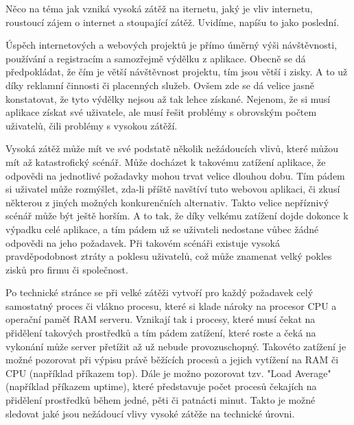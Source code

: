 \documentclass[12pt]{article}
\begin{document}
\pagestyle{headings}



\obsah
{}



Něco na téma jak vzniká vysoká zátěž na iternetu, jaký je vliv internetu, roustoucí zájem o internet a stoupající zátěž. Uvidíme, napíšu to jako poslední.


Úspěch internetových a webových projektů je přímo úměrný výši návštěvnosti, používání a registracím a samozřejmě výdělku z aplikace. Obecně se dá předpokládat, že čím je větší návštěvnost projektu, tím jsou větší i zisky. A to už díky reklamní činnosti či placenných služeb. Ovšem zde se dá velice jasně konstatovat, že tyto výdělky nejsou až tak lehce získané. Nejenom, že si musí aplikace získat své uživatele, ale musí řešit problémy s obrovským počtem uživatelů, čili problémy s vysokou zátěží.

Vysoká zátěž může mít ve své podstatě několik nežádoucích vlivů, které můžou mít až katastrofický scénář. Může docházet k takovému zatížení aplikace, že odpovědi na jednotlivé požadavky mohou trvat velice dlouhou dobu. Tím pádem si uživatel může rozmýšlet, zda-li příště navštíví tuto webovou aplikaci, či zkusí některou z jiných možných konkurenčních alternativ. Takto velice nepříznivý scénář může být ještě horším. A to tak, že díky velkému zatížení dojde dokonce k výpadku celé aplikace, a tím pádem už se uživateli nedostane vůbec žádné odpovědi na jeho požadavek. Při takovém scénáři existuje vysoká pravděpodobnost ztráty a poklesu uživatelů, což může znamenat velký pokles zisků pro firmu či společnost.

Po technické stránce se při velké zátěži vytvoří pro každý požadavek celý samostatný proces či vlákno procesu, které si klade nároky na procesor CPU a operační paměť RAM serveru. Vznikají tak i procesy, které musí čekat na přidělení takových prostředků a tím pádem zatížení, které roste a čeká na vykonání může server přetížit až už nebude provozuschopný. Takovéto zatížení je možné pozorovat při výpisu právě běžících procesů a jejich vytížení na RAM či CPU (například příkazem top). Dále je možno pozorovat tzv. "Load Average" (například příkazem uptime), které představuje počet procesů čekajích na přidělení prostředků během jedné, pěti či patnácti minut.\cite{sledovani-zatizeni} Takto je možné sledovat jaké jsou nežádoucí vlivy vysoké zátěže na technické úrovni.
\end{document}
